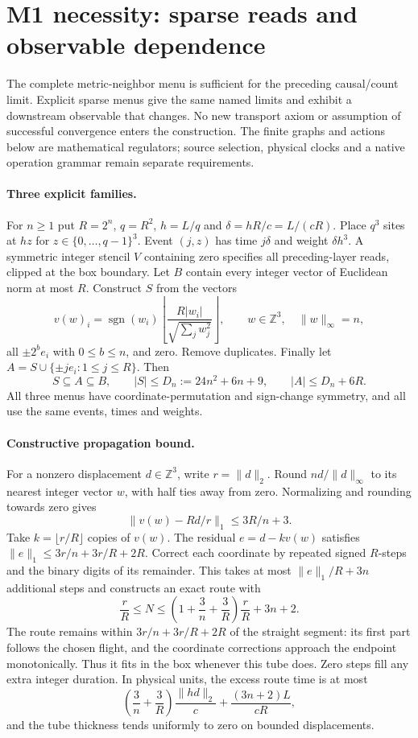 \clearpage
\section{M1 necessity: sparse reads and observable dependence}
\label{sec:m1-necessity}

The complete metric-neighbor menu is sufficient for the preceding causal/count
limit. Explicit sparse menus give the same named limits
and exhibit a downstream observable that changes. No new transport axiom or
assumption of successful convergence enters the construction. The finite
graphs and actions below are mathematical regulators; source selection,
physical clocks and a native operation grammar remain separate requirements.

\paragraph{Three explicit families.}
For $n\ge1$ put $R=2^n$, $q=R^2$, $h=L/q$ and
$\delta=hR/c=L/(cR)$. Place $q^3$ sites at $hz$ for
$z\in\{0,\ldots,q-1\}^3$. Event $(j,z)$ has time $j\delta$ and
weight $\delta h^3$. A symmetric integer stencil $V$ containing zero specifies
all preceding-layer reads, clipped at the box boundary. Let $B$ contain every
integer vector of Euclidean norm at most $R$. Construct $S$ from the vectors
\[
 v(w)_i=\operatorname{sgn}(w_i)
 \left\lfloor\frac{R|w_i|}{\sqrt{\sum_j w_j^2}}\right\rfloor,
 \qquad w\in\mathbb Z^3,\quad\|w\|_\infty=n,
\]
all $\pm2^b e_i$ with $0\le b\le n$, and zero. Remove duplicates.
Finally let $A=S\cup\{\pm j e_i:1\le j\le R\}$. Then
\[
 S\subseteq A\subseteq B,\qquad
 |S|\le D_n:=24n^2+6n+9,\qquad |A|\le D_n+6R.
\]
All three menus have coordinate-permutation and sign-change symmetry, and
all use the same events, times and weights.

\paragraph{Constructive propagation bound.}
For a nonzero displacement $d\in\mathbb Z^3$, write $r=\|d\|_2$.
Round $nd/\|d\|_\infty$ to its nearest integer vector $w$, with half ties
away from zero. Normalizing and rounding towards zero gives
\[
 \|v(w)-Rd/r\|_1\le 3R/n+3.
\]
Take $k=\lfloor r/R\rfloor$ copies of $v(w)$. The residual $e=d-kv(w)$
satisfies $\|e\|_1\le3r/n+3r/R+2R$. Correct each coordinate by repeated
signed $R$-steps and the binary digits of its remainder. This takes at most
$\|e\|_1/R+3n$ additional steps and constructs an exact route with
\begin{equation}
 \frac rR\le N\le\left(1+\frac3n+\frac3R\right)\frac rR+3n+2.
 \label{eq:m1-sparse-route}
\end{equation}
The route remains within $3r/n+3r/R+2R$ of the straight segment: its first
part follows the chosen flight, and the coordinate corrections approach the
endpoint monotonically. Thus it fits in the box whenever this tube does.
Zero steps fill any extra integer duration. In physical units, the excess
route time is at most
\[
 \left(\frac3n+\frac3R\right)\frac{\|hd\|_2}{c}
       +\frac{(3n+2)L}{cR},
\]
and the tube thickness tends uniformly to zero on bounded displacements.


